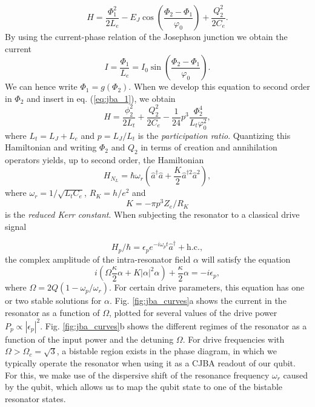 %
\begin{equation}
H = \frac{\Phi_1^2}{2L_e}-E_J\cos{\left(\frac{\Phi_2-\Phi_1}{\varphi_0}\right)}+\frac{Q_2^2}{2C_e}. \label{eq:jba_1}
\end{equation}
%
By using the current-phase relation of the Josephson junction we obtain the current
%
\begin{equation}
I = \frac{\Phi_1}{L_e} = I_0 \sin{\left(\frac{\Phi_2-\Phi_1}{\varphi_0}\right)}.
\end{equation}
%
We can hence write $\Phi_1 = g(\Phi_2)$. When we develop this equation to second order in $\Phi_2$ and insert in eq. (\ref{eq:jba_1}), we obtain
%
\begin{equation}
H = \frac{\phi_2^2}{2L_t}+\frac{Q_2^2}{2C_e}-\frac{1}{24}p^3\frac{\Phi_2^4}{L_t \varphi_0^2},
\end{equation}
%
where $L_t = L_J+L_e$ and $p=L_J/L_t$ is the {\it participation ratio}. Quantizing this Hamiltonian and writing $\Phi_2$ and $Q_2$ in terms of creation and annihilation operators yields, up to second order, the Hamiltonian
%
\begin{equation}
H_{N_L} = \hbar\omega_r \left(\hat{a}^\dagger \hat{a}+\frac{K}{2}\hat{a}^{\dagger 2}\hat{a}^2\right),
\end{equation}
%
where $\omega_r=1/\sqrt{L_t C_e}$, $R_K=h/e^2$ and 
%
\begin{equation}
K = -\pi p^3 Z_e / R_K \label{eq:KNR}
\end{equation}
%
is the {\it reduced Kerr constant}. When subjecting the resonator to a classical drive signal

%
\begin{equation}
H_p/\hbar = \epsilon_p e^{-i\omega_p t}\hat{a}^\dagger+\mathrm{h.c.},
\end{equation}
%
the complex amplitude of the intra-resonator field $\alpha$ will satisfy the equation 
%
\begin{equation}
i\left(\Omega\frac{\kappa}{2}\alpha+K|\alpha|^2\alpha\right)+\frac{\kappa}{2}\alpha = -i\epsilon_p,
\end{equation}
%
where $\Omega = 2Q\left(1-\omega_p/\omega_r\right)$. For certain drive parameters, this equation has one or two stable solutions for $\alpha$. Fig. \ref{fig:jba_curves}a shows the current in the resonator as a function of $\Omega$, plotted for several values of the drive power $P_p\propto |\epsilon_p|^2$. Fig. \ref{fig:jba_curves}b shows the different regimes of the resonator as a function of the input power and the detuning $\Omega$.  For drive frequencies with $\Omega > \Omega_c = \sqrt{3}$, a bistable region exists in the phase diagram, in which we typically operate the resonator when using it as a CJBA readout of our qubit. For this, we make use of the dispersive shift of the resonance frequency $\omega_r$ caused by the qubit, which allows us to map the qubit state to one of the bistable resonator states.

